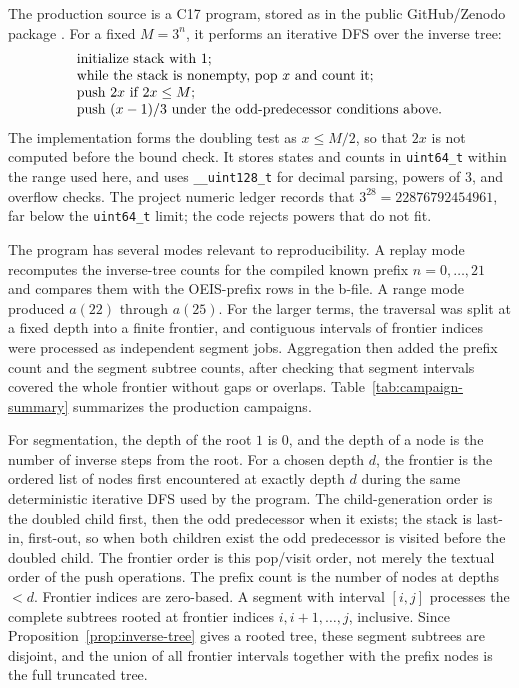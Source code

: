 \documentclass[11pt]{article}
\theoremstyle{definition}
\theoremstyle{remark}
\begin{document}
The production source is a C17 program, stored as  in the
public GitHub/Zenodo package \cite{cortiA224540Package2026}.  For a fixed
\(M=3^n\), it performs an iterative DFS over the inverse tree:
\[
\begin{array}{l}
\hbox{initialize stack with }1;\\
\hbox{while the stack is nonempty, pop }x\hbox{ and count it;}\\
\hbox{push }2x\hbox{ if }2x\leq M;\\
\hbox{push }(x-1)/3\hbox{ under the odd-predecessor conditions above.}
\end{array}
\]
The implementation forms the doubling test as \(x\leq M/2\), so that \(2x\)
is not computed before the bound check.  It stores states and counts in
\texttt{uint64\_t} within the range used here, and uses \texttt{\_\_uint128\_t}
for decimal parsing, powers of \(3\), and overflow checks.  The project
numeric ledger records that \(3^{28}=22876792454961\), far below the
\texttt{uint64\_t} limit; the code rejects powers that do not fit.

The program has several modes relevant to reproducibility.  A replay mode
recomputes the inverse-tree counts for the compiled known prefix
\(n=0,\ldots,21\) and compares them with the OEIS-prefix rows in the b-file.
A range mode produced \(a(22)\) through \(a(25)\).  For the larger terms, the
traversal was split at a fixed depth into a finite frontier, and contiguous
intervals of frontier indices were processed as independent segment jobs.
Aggregation then added the prefix count and the segment subtree counts, after
checking that segment intervals covered the whole frontier without gaps or
overlaps.  Table~\ref{tab:campaign-summary} summarizes the production
campaigns.

For segmentation, the depth of the root \(1\) is \(0\), and the depth of a
node is the number of inverse steps from the root.  For a chosen depth \(d\),
the frontier is the ordered list of nodes first encountered at exactly depth
\(d\) during the same deterministic iterative DFS used by the program.  The
child-generation order is the doubled child first, then the odd predecessor
when it exists; the stack is last-in, first-out, so when both children exist
the odd predecessor is visited before the doubled child.  The frontier order
is this pop/visit order, not merely the textual order of the push operations.
The prefix count is the number of nodes at depths \(<d\).  Frontier indices are
zero-based.  A segment with interval \([i,j]\) processes the complete subtrees
rooted at frontier indices \(i,i+1,\ldots,j\), inclusive.  Since
Proposition~\ref{prop:inverse-tree} gives a rooted tree, these segment subtrees
are disjoint, and the union of all frontier intervals together with the prefix
nodes is the full truncated tree.
\end{document}
